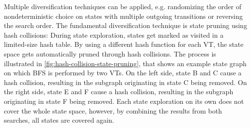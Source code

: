 \documentclass[
fancyheadings, %
%
%
]{stsreprt}
\begin{document}
Multiple diversification techniques can be applied, e.g. randomizing the order of nondeterministic choice on states with multiple outgoing transitions or reversing the search order.
The fundamental diversification technique is state pruning using hash collisions:
During state exploration, states get marked as visited in a limited-size hash table.
By using a different hash function for each VT, the state space gets automatically pruned through hash collisions.
The process is illustrated in \cref{fig:hash-collision-state-pruning}, that shows an example state graph on which BFS is performed by two VTs.
On the left side, state B and C cause a hash collision, resulting in the subgraph originating in state C being removed.
On the right side, state E and F cause a hash collision, resulting in the subgraph originating in state F being removed.
Each state exploration on its own does not cover the whole state space, however, by combining the results from both searches, all states are covered again.
\end{document}
